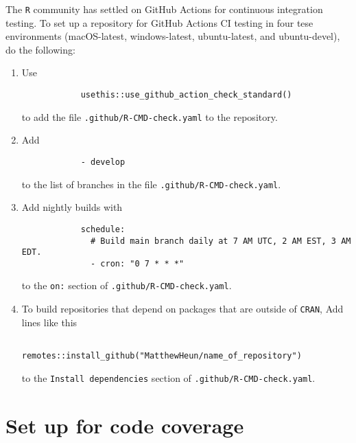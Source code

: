 \documentclass{article}
\begin{document}
The \texttt{R} community has settled on GitHub Actions for continuous integration testing.
To set up a repository for GitHub Actions CI testing in four tese environments
(macOS-latest, windows-latest, ubuntu-latest, and ubuntu-devel), 
do the following:
%
\begin{enumerate}

  \item Use 
  		\begin{verbatim}
			usethis::use_github_action_check_standard()
  	 	\end{verbatim}
		to add the file \texttt{.github/R-CMD-check.yaml} 
		to the repository.
        
  \item Add 
  		\begin{verbatim}
			- develop
		\end{verbatim}
		to the list of branches in the file \texttt{.github/R-CMD-check.yaml}.
  
  \item Add nightly builds with 
  		\begin{verbatim}
			schedule:
			  # Build main branch daily at 7 AM UTC, 2 AM EST, 3 AM EDT.
			  - cron: "0 7 * * *"
		\end{verbatim}
	    to the \texttt{on:} section of \texttt{.github/R-CMD-check.yaml}.\
		
  \item To build repositories that depend on packages that are outside of \texttt{CRAN}, 
		Add lines like this
	        \begin{verbatim}
				remotes::install_github("MatthewHeun/name_of_repository")
			\end{verbatim}
		to the \texttt{Install dependencies} section of
		\texttt{.github/R-CMD-check.yaml}.
		
\end{enumerate}


\section{Set up for code coverage}
\label{sec:codecov_setup}
\end{document}
